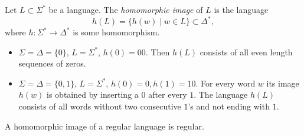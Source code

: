 \begin{page}
\setcounter{section}{3}
\setcounter{subsection}{3}
\setcounter{dfn}{10}
\label{portion:1017}

\begin{dfn}
Let $L \subset \Sigma^*$ be a language. The \emph{homomorphic image} of $L$ is the language
\[
h(L) = \{h(w) \mid w \in L\} \subset \Delta^*,
\]
where $h \colon \Sigma^* \to \Delta^*$ is some homomorphism.
\end{dfn}

\end{page}

\begin{page}
\setcounter{section}{3}
\setcounter{subsection}{3}
\setcounter{dfn}{11}
\label{portion:1020}

\begin{exl}
\begin{itemize}
\item
$\Sigma = \Delta = \{0\}$, $L = \Sigma^*$, $h(0) = 00$. Then $h(L)$ consists of all even length sequences of zeros.
\item
$\Sigma = \Delta = \{0, 1\}$, $L = \Sigma^*$, $h(0) = 0, h(1) = 10$. For every word $w$ its image $h(w)$ is obtained by inserting a $0$ after every $1$.
The language $h(L)$ consists of all words without two consecutive $1$'s and not ending with $1$.
\end{itemize}
\end{exl}

\end{page}

\begin{page}
\setcounter{section}{3}
\setcounter{subsection}{3}
\setcounter{dfn}{12}
\label{portion:1023}

\begin{thm}
A homomorphic image of a regular language is regular.
\end{thm}

\end{page}

